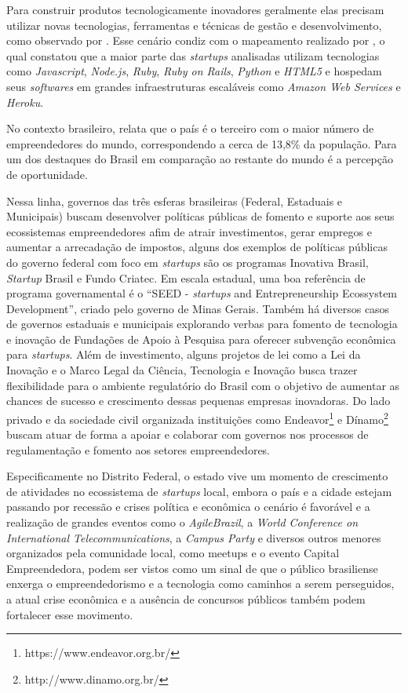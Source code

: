 Para construir produtos tecnologicamente inovadores geralmente elas precisam utilizar novas tecnologias, ferramentas e técnicas de gestão e desenvolvimento, como observado por . Esse cenário condiz com o mapeamento realizado por , o qual constatou que a maior parte das \textit{startups} analisadas utilizam tecnologias como \textit{Javascript}, \textit{Node.js}, \textit{Ruby}, \textit{Ruby on Rails}, \textit{Python} e \textit{HTML5} e hospedam seus \textit{softwares} em grandes infraestruturas escaláveis como \textit{Amazon Web Services} e \textit{Heroku}. 

No contexto brasileiro,  relata que o país é o terceiro com o maior número de empreendedores do mundo, correspondendo a cerca de 13,8\% da população. Para  um dos destaques do Brasil em comparação ao restante do mundo é a percepção de oportunidade.

Nessa linha, governos das três esferas brasileiras (Federal, Estaduais e Municipais) buscam desenvolver políticas públicas de fomento e suporte aos seus ecossistemas empreendedores afim de atrair investimentos, gerar empregos e aumentar a arrecadação de impostos, alguns dos exemplos de políticas públicas do governo federal com foco em \textit{startups} são os programas Inovativa Brasil, \textit{Startup} Brasil e Fundo Criatec. Em escala estadual, uma boa referência de programa governamental é o ``SEED - \textit{startups} and Entrepreneurship Ecossystem Development'', criado pelo governo de Minas Gerais. Também há diversos casos de governos estaduais e municipais explorando verbas para fomento de tecnologia e inovação de Fundações de Apoio à Pesquisa para oferecer subvenção econômica para \textit{startups}. Além de investimento, alguns projetos de lei como a Lei da Inovação e o Marco Legal da Ciência, Tecnologia e Inovação busca trazer flexibilidade para o ambiente regulatório do Brasil com o objetivo de aumentar as chances de sucesso e crescimento dessas pequenas empresas inovadoras. Do lado privado e da sociedade civil organizada instituições como Endeavor\footnote{https://www.endeavor.org.br/} e Dínamo\footnote{http://www.dinamo.org.br/} buscam atuar de forma a apoiar e colaborar com governos nos processos de regulamentação e fomento aos setores empreendedores.

Especificamente no Distrito Federal, o estado vive um momento de crescimento de atividades no ecossistema de \textit{startups} local, embora o país e a cidade estejam passando por recessão e crises política e econômica o cenário é favorável e a realização de grandes eventos como o \textit{AgileBrazil}, a \textit{World Conference on International Telecommunications}, a \textit{Campus Party} e diversos outros menores organizados pela comunidade local, como meetups e o evento Capital Empreendedora, podem ser vistos como um sinal de que o público brasiliense enxerga o empreendedorismo e a tecnologia como caminhos a serem perseguidos, a atual crise econômica e a ausência de concursos públicos também podem fortalecer esse movimento.

